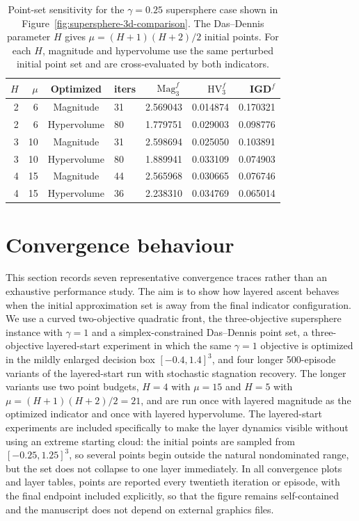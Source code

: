 \documentclass{article}
\newcommand{\Mag}{\operatorname{Mag}}
\newcommand{\HV}{\operatorname{HV}}
\begin{document}
\begin{table}[htbp]
\centering
\small
\setlength{\tabcolsep}{5pt}
\begin{tabular}{rrclrrr}
\hline
$H$ & $\mu$ & Optimized & iters & $\Mag_3^f$ & $\HV_3^f$ & IGD$^f$ \\
\hline
2 & 6 & Magnitude & 31 & 2.569043 & 0.014874 & 0.170321 \\
2 & 6 & Hypervolume & 80 & 1.779751 & 0.029003 & 0.098776 \\
3 & 10 & Magnitude & 31 & 2.598694 & 0.025050 & 0.103891 \\
3 & 10 & Hypervolume & 80 & 1.889941 & 0.033109 & 0.074903 \\
4 & 15 & Magnitude & 44 & 2.565968 & 0.030665 & 0.076746 \\
4 & 15 & Hypervolume & 36 & 2.238310 & 0.034769 & 0.065014 \\
\hline
\end{tabular}
\caption{Point-set sensitivity for the $\gamma=0.25$ supersphere case shown in Figure~\ref{fig:supersphere-3d-comparison}.  The Das--Dennis parameter $H$ gives $\mu=(H+1)(H+2)/2$ initial points.  For each $H$, magnitude and hypervolume use the same perturbed initial point set and are cross-evaluated by both indicators.}
\label{tab:three-d-pointset-sensitivity}
\end{table}




\section{Convergence behaviour}
\label{sec:convergence-behaviour}

This section records seven representative convergence traces rather than an exhaustive performance study.  The aim is to show how layered ascent behaves when the initial approximation set is away from the final indicator configuration.  We use a curved two-objective quadratic front, the three-objective supersphere instance with $\gamma=1$ and a simplex-constrained Das--Dennis point set, a three-objective layered-start experiment in which the same $\gamma=1$ objective is optimized in the mildly enlarged decision box $[-0.4,1.4]^3$, and four longer 500-episode variants of the layered-start run with stochastic stagnation recovery.  The longer variants use two point budgets, $H=4$ with $\mu=15$ and $H=5$ with $\mu=(H+1)(H+2)/2=21$, and are run once with layered magnitude as the optimized indicator and once with layered hypervolume.  The layered-start experiments are included specifically to make the layer dynamics visible without using an extreme starting cloud: the initial points are sampled from $[-0.25,1.25]^3$, so several points begin outside the natural nondominated range, but the set does not collapse to one layer immediately.  In all convergence plots and layer tables, points are reported every twentieth iteration or episode, with the final endpoint included explicitly, so that the figure remains self-contained and the manuscript does not depend on external graphics files.
\end{document}
